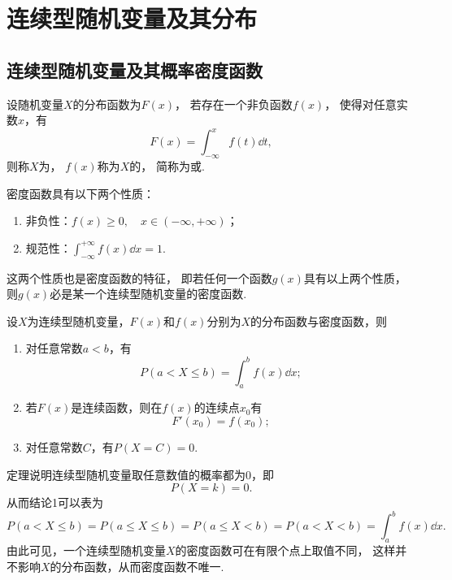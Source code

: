 \section{连续型随机变量及其分布}
\subsection{连续型随机变量及其概率密度函数}
\begin{definition}
设随机变量\(X\)的分布函数为\(F(x)\)，
若存在一个非负函数\(f(x)\)，
使得对任意实数\(x\)，有\[
	F(x) = \int_{-\infty}^x f(t) \dd{t},
\]
则称\(X\)为，
\(f(x)\)称为\(X\)的，
简称为或.
\end{definition}

\begin{property}\label{theorem:随机变量及其分布.连续型随机变量的密度函数的性质}
密度函数具有以下两个性质：
\begin{enumerate}
	\item 非负性：\(f(x) \geq 0, \quad x \in (-\infty,+\infty)\)；
	\item 规范性：\(\int_{-\infty}^{+\infty} f(x) \dd{x} = 1\).
\end{enumerate}
\end{property}
这两个性质也是密度函数的特征，
即若任何一个函数\(g(x)\)具有以上两个性质，
则\(g(x)\)必是某一个连续型随机变量的密度函数.

\begin{theorem}
设\(X\)为连续型随机变量，\(F(x)\)和\(f(x)\)分别为\(X\)的分布函数与密度函数，则
\begin{enumerate}
	\item 对任意常数\(a < b\)，有\[
		P(a < X \leq b) = \int_a^b{f(x) \dd{x}};
	\]

	\item 若\(F(x)\)是连续函数，则在\(f(x)\)的连续点\(x_0\)有\[
		F'(x_0) = f(x_0);
	\]

	\item 对任意常数\(C\)，有\(P(X=C) = 0\).
\end{enumerate}
\end{theorem}

定理说明连续型随机变量取任意数值的概率都为0，即\[
	P(X=k) = 0.
\]
从而结论1可以表为\[
	P(a < X \leq b)
	= P(a \leq X \leq b)
	= P(a \leq X < b)
	= P(a < X < b)
	= \int_a^b f(x) \dd{x}.
\]
由此可见，一个连续型随机变量\(X\)的密度函数可在有限个点上取值不同，
这样并不影响\(X\)的分布函数，从而密度函数不唯一.

